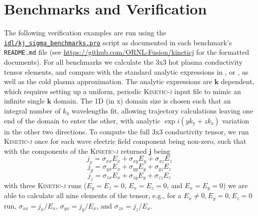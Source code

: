 \documentclass[final,5p,times,twocolumn]{elsarticle}
\renewcommand{\vec}[1]{\mathbf{#1}}
\newcommand{\kj}{\textsc{Kinetic-j}\xspace}
\begin{document}
\section{Benchmarks and Verification}
\label{section:verification}
The following verification examples are run using the \href{https://github.com/ORNL-Fusion/kineticj/blob/master/idl/kj_sigma_benchmarks.pro}{\texttt{idl/kj\_sigma\_benchmarks.pro}} script as documented in each benchmark's \texttt{README.md} file (see \url{https://github.com/ORNL-Fusion/kineticj} for the formatted documents).
%
For all benchmarks we calculate the 3x3 hot plasma conductivity tensor elements, and compare with the standard analytic expressions in \cite[pg. 255 of ][]{brambilla}, or \cite[pg. 176 of][]{swanson}, as well as the cold plasma approximation. The analytic expressions are $\vec{k}$ dependent, which requires setting up a uniform, periodic \kj input file to mimic an infinite single $\vec{k}$ domain. The 1D (in x) domain size is chosen such that an integral number of $k_{\mathrm{x}}$ wavelengths fit, allowing trajectory calculations leaving one end of the domain to enter the other, with analytic $\exp{i\left(yk_{\mathrm{y}}+zk_{\mathrm{z}}\right)}$ variation in the other two directions. To compute the full 3x3 conductivity tensor, we run \kj once for each wave electric field component being non-zero, such that with the components of the \kj returned $\vec{j}$ being 
%
\begin{equation} 
j_x = \sigma_{xx}E_x+\sigma_{xy}E_y+\sigma_{xz}E_z
\end{equation}
\begin{equation} 
j_y = \sigma_{yx}E_x+\sigma_{yy}E_y+\sigma_{yz}E_z
\end{equation}
\begin{equation} 
j_z = \sigma_{zx}E_x+\sigma_{zy}E_y+\sigma_{zz}E_z
\end{equation}
%
with three \kj runs ($E_y=E_z=0$, $E_x=E_z=0$, and $E_x=E_y=0$) we are able to calculate all nine elements of the tensor, e.g., for a $E_x\ne0,E_y=0,E_z=0$ run, $\sigma_{xx}=j_x/E_x$, $\sigma_{yx}=j_y/E_x$, and $\sigma_{zx}=j_z/E_x$. 
%
\end{document}

